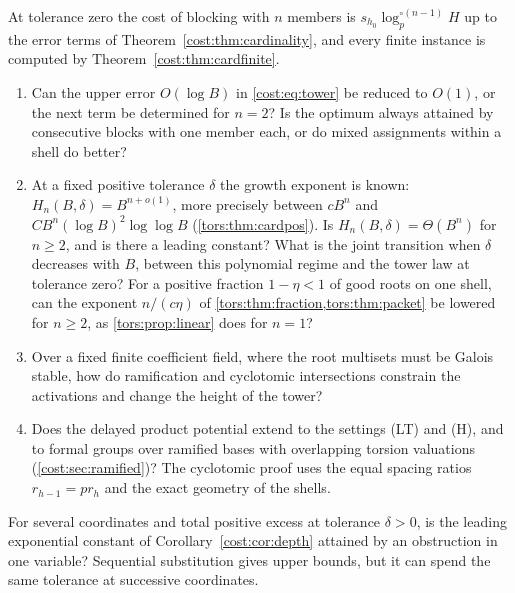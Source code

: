 \begin{question}\label{cost:q:cardinality}
At tolerance zero the cost of blocking with $n$ members is $s_{h_0}\log_p^{\circ(n-1)}H$
up to the error terms of Theorem~\ref{cost:thm:cardinality}, and every finite instance is
computed by Theorem~\ref{cost:thm:cardfinite}.
\begin{enumerate}[label=\textup{(\alph*)}]
\item Can the upper error $O(\log B)$ in \eqref{cost:eq:tower} be reduced to $O(1)$, or the
next term be determined for $n=2$? Is the optimum always attained by consecutive blocks with
one member each, or do mixed assignments within a shell do better?
\item\label{tors:q:cardinality} At a fixed positive tolerance $\delta$ the growth exponent
is known: $H_n(B,\delta)=B^{n+o(1)}$, more precisely between $cB^n$ and
$CB^n(\log B)^2\log\log B$ (\cref{tors:thm:cardpos}). Is $H_n(B,\delta)=\Theta(B^n)$ for
$n\ge2$, and is there a leading constant? What is the joint transition when $\delta$
decreases with $B$, between this polynomial regime and the tower law at tolerance zero?
For a positive fraction $1-\eta<1$ of good roots on one shell, can the exponent
$n/(c\eta)$ of \cref{tors:thm:fraction,tors:thm:packet} be lowered for $n\ge2$, as
\cref{tors:prop:linear} does for $n=1$?
\item Over a fixed finite coefficient field, where the root multisets must be Galois
stable, how do ramification and cyclotomic intersections constrain the activations and
change the height of the tower?
\item Does the delayed product potential extend to the settings \textup{(LT)} and
\textup{(H)}, and to formal groups over ramified bases with overlapping torsion valuations
(\cref{cost:sec:ramified})? The cyclotomic proof uses the equal spacing ratios
$r_{h-1}=pr_h$ and the exact geometry of the shells.
\end{enumerate}
\end{question}

\begin{question}\label{cost:q:several}
For several coordinates and total positive excess at tolerance $\delta>0$, is the leading
exponential constant of Corollary~\ref{cost:cor:depth} attained by an obstruction in one variable?
Sequential substitution gives upper bounds, but it can spend the same tolerance at
successive coordinates.
\end{question}

